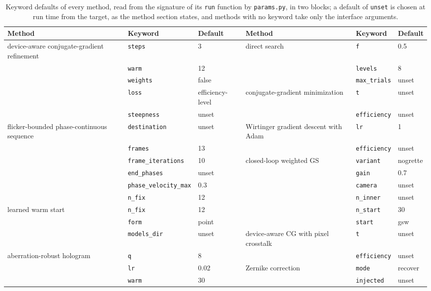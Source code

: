 \begin{table}[t]\centering\scriptsize\setlength{\tabcolsep}{4pt}
\caption{Keyword defaults of every method, read from the signature of its \texttt{run} function by \texttt{params.py}, in two blocks; a default of \texttt{unset} is chosen at run time from the target, as the method section states, and methods with no keyword take only the interface arguments.}\label{tab:defaults}
\begin{tabular}{@{}>{\raggedright\arraybackslash}p{} l l @{\hskip 1.2em} >{\raggedright\arraybackslash}p{} l l@{}}\toprule Method & Keyword & Default & Method & Keyword & Default\\\midrule
device-aware conjugate-gradient refinement & \texttt{steps} & 3 & direct search & \texttt{f} & 0.5\\
 & \texttt{warm} & 12 &  & \texttt{levels} & 8\\
 & \texttt{weights} & false &  & \texttt{max\_trials} & unset\\
 & \texttt{loss} & efficiency-level & conjugate-gradient minimization & \texttt{t} & unset\\
 & \texttt{steepness} & unset &  & \texttt{efficiency} & unset\\
flicker-bounded phase-continuous sequence & \texttt{destination} & unset & Wirtinger gradient descent with Adam & \texttt{lr} & 1\\
 & \texttt{frames} & 13 &  & \texttt{efficiency} & unset\\
 & \texttt{frame\_iterations} & 10 & closed-loop weighted GS & \texttt{variant} & nogrette\\
 & \texttt{end\_phases} & unset &  & \texttt{gain} & 0.7\\
 & \texttt{phase\_velocity\_max} & 0.3 &  & \texttt{camera} & unset\\
 & \texttt{n\_fix} & 12 &  & \texttt{n\_inner} & unset\\
learned warm start & \texttt{n\_fix} & 12 &  & \texttt{n\_start} & 30\\
 & \texttt{form} & point &  & \texttt{start} & gsw\\
 & \texttt{models\_dir} & unset & device-aware CG with pixel crosstalk & \texttt{t} & unset\\
aberration-robust hologram & \texttt{q} & 8 &  & \texttt{efficiency} & unset\\
 & \texttt{lr} & 0.02 & Zernike correction & \texttt{mode} & recover\\
 & \texttt{warm} & 30 &  & \texttt{injected} & unset\\

\end{tabular}
\end{table}
